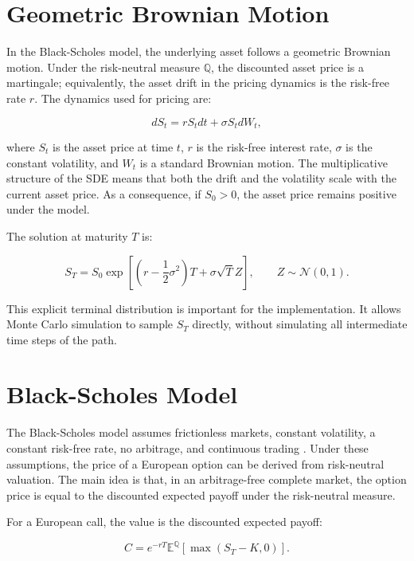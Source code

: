 \section{Geometric Brownian Motion}

In the Black-Scholes model, the underlying asset follows a geometric Brownian motion.
Under the risk-neutral measure $\mathbb{Q}$, the discounted asset price is a martingale; equivalently, the asset drift in the pricing dynamics is the risk-free rate $r$.
The dynamics used for pricing are:

\begin{equation}
    dS_t = r S_t dt + \sigma S_t dW_t,
\end{equation}

where $S_t$ is the asset price at time $t$, $r$ is the risk-free interest rate, $\sigma$ is the constant volatility, and $W_t$ is a standard Brownian motion.
The multiplicative structure of the SDE means that both the drift and the volatility scale with the current asset price.
As a consequence, if $S_0 > 0$, the asset price remains positive under the model.

The solution at maturity $T$ is:

\begin{equation}
    S_T = S_0 \exp\left[\left(r - \frac{1}{2}\sigma^2\right)T + \sigma \sqrt{T} Z\right],
    \qquad Z \sim \mathcal{N}(0,1).
\end{equation}

This explicit terminal distribution is important for the implementation.
It allows Monte Carlo simulation to sample $S_T$ directly, without simulating all intermediate time steps of the path.

\section{Black-Scholes Model}

The Black-Scholes model assumes frictionless markets, constant volatility, a constant risk-free rate, no arbitrage, and continuous trading \cite{black1973pricing,shreve2004stochastic}.
Under these assumptions, the price of a European option can be derived from risk-neutral valuation.
The main idea is that, in an arbitrage-free complete market, the option price is equal to the discounted expected payoff under the risk-neutral measure.

For a European call, the value is the discounted expected payoff:

\begin{equation}
    C = e^{-rT}\mathbb{E}^{\mathbb{Q}}\left[\max(S_T - K, 0)\right].
\end{equation}

